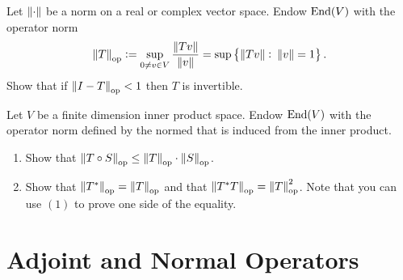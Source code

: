 \documentclass[11pt, a4paper]{article}
\begin{document}
\begin{exercise}
  Let $\left\lVert\cdot\right\rVert$ be a norm on a real or complex vector space.
  Endow $\operatorname{End}(V)$ with the operator norm
  \[
    \left\lVert T\right\rVert_{\operatorname{op}} :=
    \sup_{0 \neq v \in V} \frac{\left\lVert Tv\right\rVert}{\left\lVert v\right\rVert} =
    \sup\left\{\left\lVert Tv\right\rVert \colon \left\lVert v\right\rVert = 1\right\}.
  \]
  Show that if $\left\lVert I - T\right\rVert_{\operatorname{op}} < 1$ then $T$ is invertible.
\end{exercise}

\begin{exercise}
  Let $V$ be a finite dimension inner product space.
  Endow $\operatorname{End}(V)$ with the operator norm defined by the normed that is
  induced from the inner product.
  \begin{enumerate}
    \item[(1)] Show that 
      $\left\lVert T \circ S\right\rVert_{\operatorname{op}} \le \left\lVert T\right\rVert_{\operatorname{op}} \cdot \left\lVert S\right\rVert_{\operatorname{op}}$.
    \item[(2)] Show that $\left\lVert T^*\right\rVert_{\operatorname{op}} = \left\lVert T\right\rVert_{\operatorname{op}}$
      and that $\left\lVert T^* T\right\rVert_{\operatorname{op}} = \left\lVert T\right\rVert_{\operatorname{op}}^{2}$.
      Note that you can use $(1)$ to prove one side of the equality.
  \end{enumerate}
\end{exercise}

\newpage

\section{Adjoint and Normal Operators}
\end{document}
